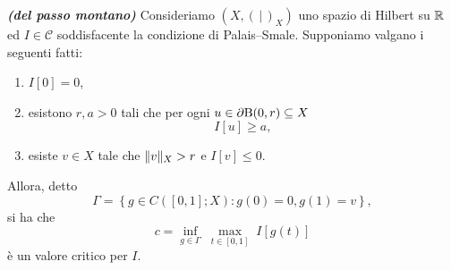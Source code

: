 \begin{teorema}\emph{\textbf{(del passo montano)}}
	Consideriamo $(X, (\,|\,)_X)$ uno spazio di Hilbert su $\mathbb{R}$ ed $I \in \mathcal{C}$ soddisfacente la condizione di Palais--Smale. Supponiamo valgano i seguenti fatti:
	\begin{enumerate}[$(i)$]
		\item $I[0] = 0$,
		\item esistono $r,a>0$ tali che per ogni $u \in \partial\textup{B}(0,r) \subseteq X$
		\[ I[u] \ge a, \]
		\item esiste $v \in X$ tale che $\lVert v\rVert_X > r$ e $I[v] \le 0$.
	\end{enumerate}
	Allora, detto 
	\[ \Gamma = \left\lbrace g \in C([0,1];X): g(0) = 0, g(1) = v\right\rbrace,  \]
	si ha che 
	\[ c = \underset{g \in \Gamma}{\inf}\; \underset{t \in [0,1]}{\max}\; I[g(t)] \]
	è un valore critico per $I$.
\end{teorema}
